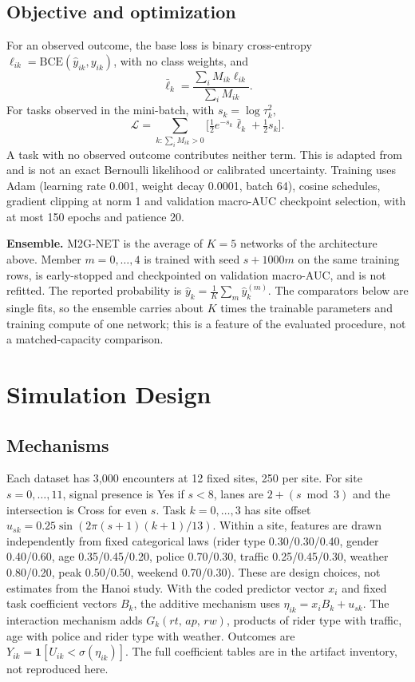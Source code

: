\documentclass[9pt, conference, a4paper, compsocconf]{IEEEtran}
\begin{document}
\subsection{Objective and optimization}
For an observed outcome, the base loss is binary cross-entropy $\ell_{ik}=\mathrm{BCE}(\hat y_{ik},y_{ik})$, with no class weights, and
\begin{equation}
\bar\ell_k=\frac{\sum_iM_{ik}\ell_{ik}}{\sum_iM_{ik}}.
\end{equation}
For tasks observed in the mini-batch, with $s_k=\log\tau_k^2$,
\begin{equation}
\mathcal{L}=\sum_{k:\sum_iM_{ik}>0}\Big[\tfrac12e^{-s_k}\bar\ell_k+\tfrac12s_k\Big].
\end{equation}
A task with no observed outcome contributes neither term. This is adapted from \cite{Kendall2018multi} and is not an exact Bernoulli likelihood or calibrated uncertainty. Training uses Adam \cite{Kingma2015adam} (learning rate 0.001, weight decay 0.0001, batch 64), cosine schedules, gradient clipping at norm 1 and validation macro-AUC checkpoint selection, with at most 150 epochs and patience 20.

\textbf{Ensemble.} M2G-NET is the average of $K=5$ networks of the architecture above. Member $m=0,\dots,4$ is trained with seed $s+1000m$ on the same training rows, is early-stopped and checkpointed on validation macro-AUC, and is not refitted. The reported probability is $\hat y_k=\frac1K\sum_m\hat y_k^{(m)}$. The comparators below are single fits, so the ensemble carries about $K$ times the trainable parameters and training compute of one network; this is a feature of the evaluated procedure, not a matched-capacity comparison.

\section{Simulation Design}
\subsection{Mechanisms}
Each dataset has 3,000 encounters at 12 fixed sites, 250 per site. For site $s=0,\dots,11$, signal presence is Yes if $s<8$, lanes are $2+(s \bmod 3)$ and the intersection is Cross for even $s$. Task $k=0,\dots,3$ has site offset $u_{sk}=0.25\sin(2\pi(s+1)(k+1)/13)$. Within a site, features are drawn independently from fixed categorical laws (rider type 0.30/0.30/0.40, gender 0.40/0.60, age 0.35/0.45/0.20, police 0.70/0.30, traffic 0.25/0.45/0.30, weather 0.80/0.20, peak 0.50/0.50, weekend 0.70/0.30). These are design choices, not estimates from the Hanoi study. With the coded predictor vector $x_i$ and fixed task coefficient vectors $B_k$, the additive mechanism uses $\eta_{ik}=x_iB_k+u_{sk}$. The interaction mechanism adds $G_k(rt,\,ap,\,rw)$, products of rider type with traffic, age with police and rider type with weather. Outcomes are $Y_{ik}=\mathbf{1}[U_{ik}<\sigma(\eta_{ik})]$. The full coefficient tables are in the artifact inventory, not reproduced here.
\end{document}
